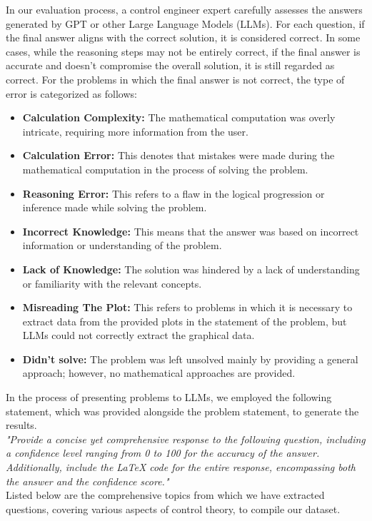 \documentclass[12pt]{article}
\begin{document}
In our evaluation process, a control engineer expert carefully assesses the answers generated by GPT or other Large Language Models (LLMs). For each question, if the final answer aligns with the correct solution, it is considered correct. In some cases, while the reasoning steps may not be entirely correct, if the final answer is accurate and doesn't compromise the overall solution, it is still regarded as correct. For the problems in which the final answer is not correct, the type of error is categorized as follows:
\begin{itemize}
    \item \textbf{Calculation Complexity:} The mathematical computation was overly intricate, requiring more information from the user.
    \item \textbf{Calculation Error:} This denotes that mistakes were made during the mathematical computation in the process of solving the problem.
    \item \textbf{Reasoning Error:} This refers to a flaw in the logical progression or inference made while solving the problem.
    \item \textbf{Incorrect Knowledge:} This means that the answer was based on incorrect information or understanding of the problem.
    \item\textbf{Lack of Knowledge:} The solution was hindered by a lack of understanding or familiarity with the relevant concepts.
    \item \textbf{Misreading The Plot:} This refers to problems in which it is necessary to extract data from the provided plots in the statement of the problem, but LLMs could not correctly extract the graphical data.
    \item \textbf{Didn't solve:} The problem was left unsolved mainly by providing a general approach; however, no mathematical approaches are provided.
\end{itemize}

In the process of presenting problems to LLMs, we employed the following statement, which was provided alongside the problem statement, to generate the results.\\
\textit{"Provide a concise yet comprehensive response to the following question, including a confidence level ranging from 0 to 100 for the accuracy of the answer. Additionally, include the LaTeX code for the entire response, encompassing both the answer and the confidence score."}\\
\clearpage
Listed below are the comprehensive topics from which we have extracted questions, covering various aspects of control theory, to compile our dataset.
\end{document}
